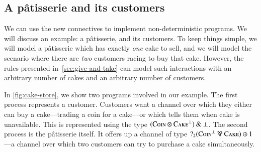 \documentclass[twocolumn]{article}
\begin{document}
\subsection{A p\^{a}tisserie and its customers}
We can use the new connectives to implement non-deterministic programs.
We will discuss an example: a p\^{a}tisserie, and its customers.
To keep things simple, we will model a p\^{a}tisserie which has exactly
\emph{one} cake to sell, and we will model the scenario where there are
\emph{two} customers racing to buy that cake.
However, the rules presented in~\autoref{sec:give-and-take} can model such
interactions with an arbitrary number of cakes and an arbitrary number of
customers.

In \autoref{fig:cake-store}, we show two programs involved in our example.
The first process represents a customer. Customers want a channel over which
they either can buy a cake---trading a coin for a cake---or which tells them
when cake is unavailable. This is represented using the type
$(\textsc{Coin}\otimes\textsc{Cake}^\bot)\mathbin{\text{\&}}\bot$.
The second process is the p\^{a}tisserie itself. It offers up a channel of type
$\give[2]{(\coin^\bot\parr\cake)\plus{1}}$---a channel over which two customers
can try to purchase a cake simultaneously.
\end{document}
